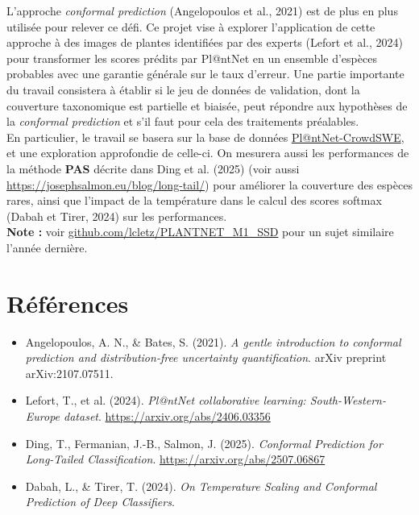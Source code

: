 \documentclass[12pt,a4paper]{article}
\begin{document}
L'approche \textit{conformal prediction} (Angelopoulos et al., 2021) est de plus en plus utilisée pour relever ce défi. Ce projet vise à explorer l'application de cette approche à des images de plantes identifiées par des experts (Lefort et al., 2024) pour transformer les scores prédits par Pl@ntNet en un ensemble d'espèces probables avec une garantie générale sur le taux d'erreur. Une partie importante du travail consistera à établir si le jeu de données de validation, dont la couverture taxonomique est partielle et biaisée, peut répondre aux hypothèses de la \textit{conformal prediction} et s'il faut pour cela des traitements préalables. \\

En particulier, le travail se basera sur la base de données \href{https://zenodo.org/records/10782465}{Pl@ntNet-CrowdSWE}, et une exploration approfondie de celle-ci. On mesurera aussi les performances de la méthode \textbf{PAS} décrite dans Ding et al. (2025) (voir aussi \url{https://josephsalmon.eu/blog/long-tail/}) pour améliorer la couverture des espèces rares, ainsi que l'impact de la température dans le calcul des scores softmax (Dabah et Tirer, 2024) sur les performances. \\

\textbf{Note :} voir \href{https://github.com/lcletz/PLANTNET_M1_SSD}{github.com/lcletz/PLANTNET\_M1\_SSD} pour un sujet similaire l'année dernière.

\section*{Références}

\begin{itemize}[label=\textbullet]
    \item Angelopoulos, A. N., \& Bates, S. (2021). \textit{A gentle introduction to conformal prediction and distribution-free uncertainty quantification}. arXiv preprint arXiv:2107.07511.
    
    \item Lefort, T., et al. (2024). \textit{Pl@ntNet collaborative learning: South-Western-Europe dataset}. \href{https://arxiv.org/abs/2406.03356}{https://arxiv.org/abs/2406.03356}
    
    \item Ding, T., Fermanian, J.-B., Salmon, J. (2025). \textit{Conformal Prediction for Long-Tailed Classification}. \href{https://arxiv.org/abs/2507.06867}{https://arxiv.org/abs/2507.06867}
    
    \item Dabah, L., \& Tirer, T. (2024). \textit{On Temperature Scaling and Conformal Prediction of Deep Classifiers}.
\end{itemize}
\end{document}
